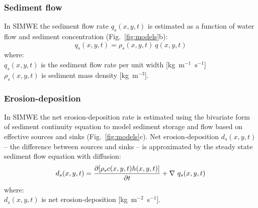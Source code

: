 \documentclass[gmd, manuscript]{copernicus}
\begin{document}

\subsubsection{Sediment flow}

In SIMWE the sediment flow rate $q_s(x,y,t)$ is estimated 
as a function of water flow and sediment concentration
\citep{Mitas1998}
(Fig.~\ref{fig:models}b): %
\begin{equation}\label{eq:sedflow} 
q_s(x,y,t) = \rho_s(x,y,t) ~ q(x,y,t)
\end{equation}
{\small
\noindent
where: \\
\hspace*{0.5em} $q_s(x,y,t)$ is the sediment flow rate per unit width [\unit{kg~m}$^{-1}$~\unit{s}$^{-1}$]\\
\hspace*{0.5em} $\rho_s(x,y,t)$ is sediment mass density [\unit{kg~m}$^{-3}$].\\
}


\subsubsection{Erosion-deposition}

In SIMWE 
the net erosion-deposition rate is estimated
using the bivariate form of sediment continuity equation
to model sediment storage and flow 
based on effective sources and sinks
(Fig.~\ref{fig:models}c). %
Net erosion-deposition $d_s(x,y,t)$
-- the difference between sources and sinks --
is approximated by
the steady state sediment flow equation with diffusion:
\begin{equation}\label{eq:sediment} 
d_s(x,y,t) = 
{\partial [\rho_sc(x,y,t)h(x,y,t)] \over \partial t} +
\nabla ~ q_s(x,y,t)
\end{equation}
{\small
\noindent
where: \\
\hspace*{0.5em} $d_s(x,y,t)$ is net erosion-deposition [\unit{kg~m}$^{-2}$~\unit{s}$^{-1}$].\\
}
\end{document}
